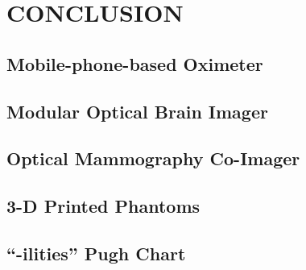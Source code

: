 \chapter{CONCLUSION} %
\label{chap:conclusion}



\section{Mobile-phone-based Oximeter}



\section{Modular Optical Brain Imager}



\section{Optical Mammography Co-Imager}



\section{3-D Printed Phantoms}



\section{``-ilities'' Pugh Chart}
